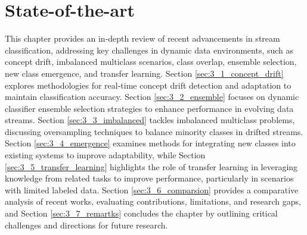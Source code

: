 \chapter{State-of-the-art}
\label{cha:3_State-of-the-art}

This chapter provides an in-depth review of recent advancements in stream classification, addressing key challenges in dynamic data environments, such as concept drift, imbalanced multiclass scenarios, class overlap, ensemble selection, new class emergence, and transfer learning. Section \ref{sec:3_1_concept_drift} explores methodologies for real-time concept drift detection and adaptation to maintain classification accuracy. Section \ref{sec:3_2_ensemble} focuses on dynamic classifier ensemble selection strategies to enhance performance in evolving data streams. Section \ref{sec:3_3_imbalanced} tackles imbalanced multiclass problems, discussing oversampling techniques to balance minority classes in drifted streams. Section \ref{sec:3_4_emergence} examines methods for integrating new classes into existing systems to improve adaptability, while Section \ref{sec:3_5_transfer_learning} highlights the role of transfer learning in leveraging knowledge from related tasks to improve performance, particularly in scenarios with limited labeled data. Section \ref{sec:3_6_comparsion} provides a comparative analysis of recent works, evaluating contributions, limitations, and research gaps, and Section \ref{sec:3_7_remartks} concludes the chapter by outlining critical challenges and directions for future research.


